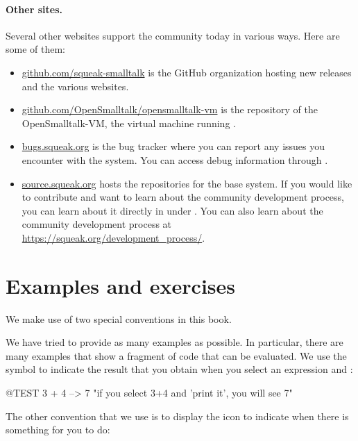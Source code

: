 \documentclass[a4paper,10pt,twoside]{book}
\begin{document}
\paragraph{Other sites.} Several other websites support the \sq community today in various ways.
Here are some of them:
\begin{itemize}
  \item \url{github.com/squeak-smalltalk} is the GitHub organization hosting new releases and the various \sq websites.

  \item \url{github.com/OpenSmalltalk/opensmalltalk-vm} is the repository of the OpenSmalltalk-VM, the virtual machine running \sq.

  \item \url{bugs.squeak.org} is the bug tracker where you can report any issues you encounter with the system. You can access debug information through .

  \item \url{source.squeak.org} hosts the repositories for the base system. If you would like to contribute and want to learn about the community development process, you can learn about it directly in \Squeak under . You can also learn about the community development process at \url{https://squeak.org/development_process/}.

\end{itemize}

\section*{Examples and exercises}

We make use of two special conventions in this book.

We have tried to provide as many examples as possible.
In particular, there are many examples that show a fragment of code that can be evaluated.
We use the symbol \ct{-->} to indicate the result that you obtain when you select an expression and :

\begin{code}{@TEST}
3 + 4 --> 7    "if you select 3+4 and 'print it', you will see 7"
\end{code}


The other convention that we use is to display the icon \dothisicon{} to indicate when there is something for you to do:


\ifx\wholebook\relax\else
   
   
\end{document}

